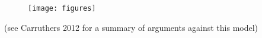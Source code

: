 \begin{figure}[h]
  \centering
  \texttt{[image: figures]}
   \caption{}
  \Description{
}
  \label{fig:com_model}
\end{figure}
(see Carruthers 2012 for a summary of arguments against this model)






